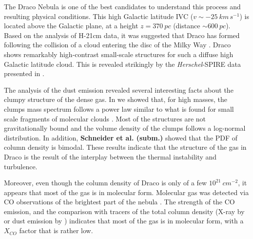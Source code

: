 \documentclass[traditabstract]{aa}
\begin{document}

   The Draco Nebula is one of the best candidates to understand this process and resulting physical conditions. This high Galactic latitude IVC ($v\sim -25\: km\, s^{-1}$) is located above the Galactic plane, at a height $z=370\: pc$ (distance $\sim 600\: pc$). Based on the analysis of H-21cm data, it was suggested that Draco has formed following the collision of a cloud entering the disc of the Milky Way \citep{Goerigk_1983}.
Draco shows remarkably high-contrast small-scale structures for such a diffuse high Galactic latitude cloud. This is revealed strikingly by the \emph{Herschel}-SPIRE data presented in \cite{MAMD_2017b}.

   The analysis of the dust emission revealed several interesting facts about the clumpy structure of the dense gas. In \cite{MAMD_2017b} we showed that, for high masses, the clumps mass spectrum follows a power law similar to what is found for small scale fragments of molecular clouds \cite{Peretto_2010}. Most of the structures are not gravitationally bound and the volume density of the clumps follows a log-normal distribution. In addition, \textbf{Schneider et al. (subm.)} showed that the PDF of column density is bimodal. These results indicate that the structure of the gas in Draco is the result of the interplay between the thermal instability and turbulence.

   Moreover, even though the column density of Draco is only of a few $10^{21}\: cm^{-2}$, it appears that most of the gas is in molecular form. Molecular gas was detected via CO observations of the brightest part of the nebula \citep{Mebold_1985,Rohlfs_1989}. The strength of the CO emission, and the comparison with tracers of the total column density (X-ray by \citealt{Moritz_1998} or dust emission by \citealt{Herbstmeier_1993, Planck_XXIV_2011}) indicates that most of the gas is in molecular form, with a $X_{CO}$ factor that is rather low.
\end{document}
